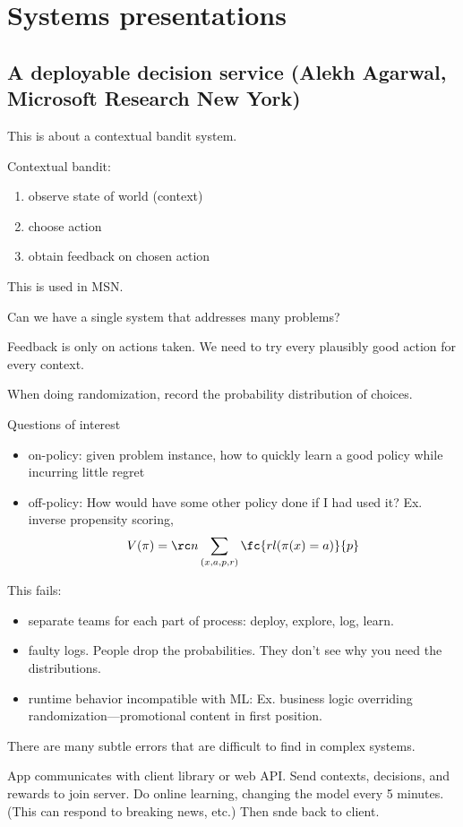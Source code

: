 \section{Systems presentations}

\subsection{A deployable decision service (Alekh Agarwal, Microsoft Research New York)}

This is about a contextual bandit system.

Contextual bandit:
\begin{enumerate}
\item
observe state of world (context)
\item
choose action
\item
obtain feedback on chosen action
\end{enumerate}

This is used in MSN.

Can we have a single system that addresses many problems? 

Feedback is only on actions taken. We need to try every plausibly good action for every context.

When doing randomization, record the probability distribution of choices. 

Questions of interest
\begin{itemize}
\item
on-policy: given problem instance, how to quickly learn a good policy while incurring little regret
\item
off-policy: How would have some other policy done if I had used it? Ex. inverse propensity scoring,
$$
V(\pi) = \rc n\sum_{(x,a,p,r)} \fc{rl(\pi(x)=a)}{p}
$$
\end{itemize}

This fails:
\begin{itemize}
\item
separate teams for each part of process: deploy, explore, log, learn.
\item
faulty logs. People drop the probabilities. They don't see why you need the distributions.
\item
runtime behavior incompatible with ML: Ex. business logic overriding randomization---promotional content in first position.
\end{itemize}
There are many subtle errors that are difficult to find in complex systems.

App communicates with client library or web API. Send contexts, decisions, and rewards to join server. Do online learning, changing the model every 5 minutes. (This can respond to breaking news, etc.) Then snde back to client.

